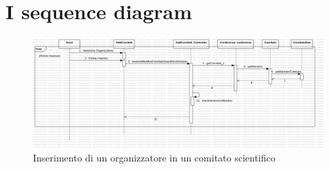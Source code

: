 \section{I sequence diagram}
\begin{figure}[h!]
	\includegraphics[scale=0.35]{Immagini/aggiuntaMembriComitatoScientifico.png}
	\caption{Inserimento di un organizzatore in un comitato scientifico}
\end{figure}